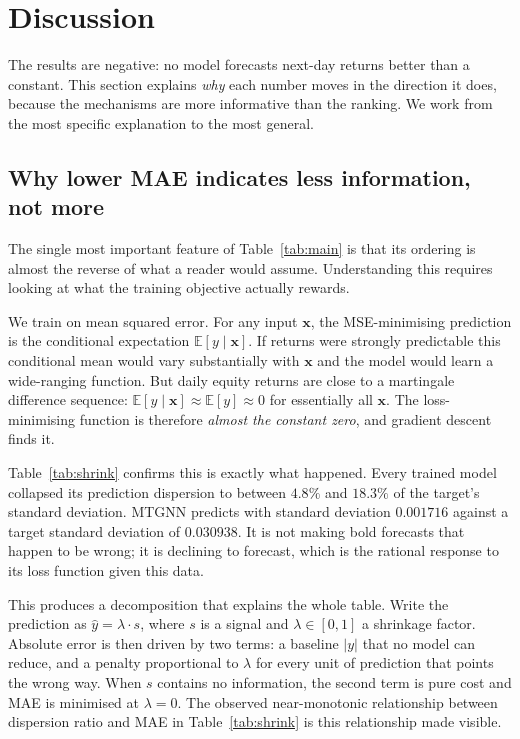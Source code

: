 \section{Discussion}
\label{sec:discussion}

The results are negative: no model forecasts next-day returns better than a constant. This section explains \emph{why} each number moves in the direction it does, because the mechanisms are more informative than the ranking. We work from the most specific explanation to the most general.

\subsection{Why lower MAE indicates less information, not more}

The single most important feature of Table~\ref{tab:main} is that its ordering is almost the reverse of what a reader would assume. Understanding this requires looking at what the training objective actually rewards.

We train on mean squared error. For any input $\mathbf{x}$, the MSE-minimising prediction is the conditional expectation $\mathbb{E}[y \mid \mathbf{x}]$. If returns were strongly predictable this conditional mean would vary substantially with $\mathbf{x}$ and the model would learn a wide-ranging function. But daily equity returns are close to a martingale difference sequence: $\mathbb{E}[y \mid \mathbf{x}] \approx \mathbb{E}[y] \approx 0$ for essentially all $\mathbf{x}$. The loss-minimising function is therefore \emph{almost the constant zero}, and gradient descent finds it.

Table~\ref{tab:shrink} confirms this is exactly what happened. Every trained model collapsed its prediction dispersion to between $4.8\%$ and $18.3\%$ of the target's standard deviation. MTGNN predicts with standard deviation $0.001716$ against a target standard deviation of $0.030938$. It is not making bold forecasts that happen to be wrong; it is declining to forecast, which is the rational response to its loss function given this data.

This produces a decomposition that explains the whole table. Write the prediction as $\hat{y} = \lambda \cdot s$, where $s$ is a signal and $\lambda \in [0,1]$ a shrinkage factor. Absolute error is then driven by two terms: a baseline $|y|$ that no model can reduce, and a penalty proportional to $\lambda$ for every unit of prediction that points the wrong way. When $s$ contains no information, the second term is pure cost and MAE is minimised at $\lambda = 0$. The observed near-monotonic relationship between dispersion ratio and MAE in Table~\ref{tab:shrink} is this relationship made visible.

